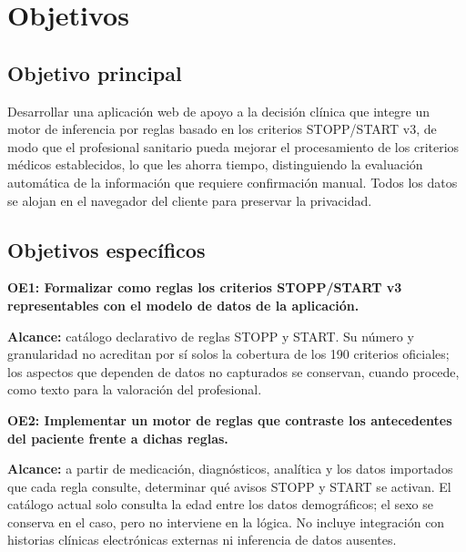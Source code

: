 
\chapter{Objetivos}
\label{cap:objetivos}

\section{Objetivo principal}

Desarrollar una aplicación web de apoyo a la decisión clínica que integre un
motor de inferencia por reglas basado en los criterios STOPP/START v3, de
modo que el profesional sanitario pueda mejorar el procesamiento de los
criterios médicos establecidos, lo que les ahorra tiempo, distinguiendo la
evaluación automática de la información que requiere confirmación manual.
Todos los datos se alojan en el navegador del cliente para preservar la
privacidad.

\section{Objetivos específicos}

\noindent\textbf{OE1: Formalizar como reglas los criterios STOPP/START v3
representables con el modelo de datos de la aplicación.}

\textbf{Alcance:} catálogo declarativo de reglas STOPP y START. Su número y
granularidad no acreditan por sí solos la cobertura de los 190 criterios
oficiales; los aspectos que dependen de datos no capturados se conservan, cuando
procede, como texto para la valoración del profesional.

\medskip
\noindent\textbf{OE2: Implementar un motor de reglas que contraste los
antecedentes del paciente frente a dichas reglas.}

\textbf{Alcance:} a partir de medicación, diagnósticos, analítica y los datos
importados que cada regla consulte, determinar qué avisos STOPP y START se
activan. El catálogo actual solo consulta la edad entre los datos demográficos;
el sexo se conserva en el caso, pero no interviene en la lógica. No incluye
integración con historias clínicas electrónicas externas ni inferencia de datos
ausentes.

